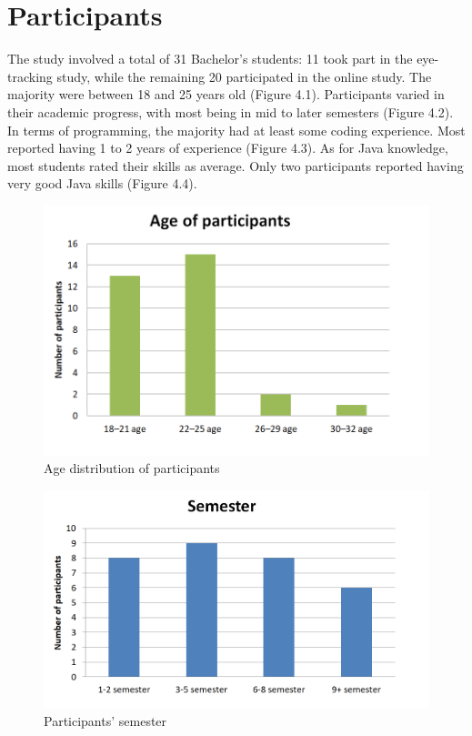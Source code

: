 \section{Participants}

The study involved a total of 31 Bachelor’s students: 11 took part in the eye-tracking study, while the remaining 20 participated in the online study. The majority were between 18 and 25 years old (Figure 4.1).
Participants varied in their academic progress, with most being in mid to later semesters (Figure 4.2).
In terms of programming, the majority had at least some coding experience. Most reported having 1 to 2 years of experience (Figure 4.3).
As for Java knowledge, most students rated their skills as average. Only two participants reported having very good Java skills (Figure 4.4).


\begin{figure} [H]
  \centering
  \includegraphics[scale=0.9]{figures/age.png}
  \caption{Age distribution of participants}
  \label{fig:AnhangsChor}
\end{figure}


\begin{figure} [H]
  \centering
  \includegraphics[scale=0.8]{figures/semester.png}
  \caption{Participants' semester}
  \label{fig:AnhangsChor}
\end{figure}

